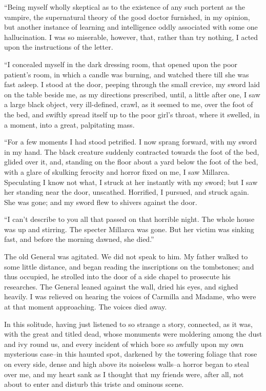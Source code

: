 \documentclass[11pt,twoside,makeidx,hidelinks,]{memoir}
\begin{document}
``Being myself wholly skeptical as to the existence of any such portent
as the vampire, the supernatural theory of the good doctor furnished, in
my opinion, but another instance of learning and intelligence oddly
associated with some one hallucination. I was so miserable, however,
that, rather than try nothing, I acted upon the instructions of
the letter.

``I concealed myself in the dark dressing room, that opened upon the poor
patient's room, in which a candle was burning, and watched there till
she was fast asleep. I stood at the door, peeping through the small
crevice, my sword laid on the table beside me, as my directions
prescribed, until, a little after one, I saw a large black object, very
ill-defined, crawl, as it seemed to me, over the foot of the bed, and
swiftly spread itself up to the poor girl's throat, where it swelled, in
a moment, into a great, palpitating mass.

``For a few moments I had stood petrified. I now sprang forward, with my
sword in my hand. The black creature suddenly contracted towards the
foot of the bed, glided over it, and, standing on the floor about a yard
below the foot of the bed, with a glare of skulking ferocity and horror
fixed on me, I saw Millarca. Speculating I know not what, I struck at
her instantly with my sword; but I saw her standing near the door,
unscathed. Horrified, I pursued, and struck again. She was gone; and my
sword flew to shivers against the door.

``I can't describe to you all that passed on that horrible night. The
whole house was up and stirring. The specter Millarca was gone. But her
victim was sinking fast, and before the morning dawned, she died.''

The old General was agitated. We did not speak to him. My father walked
to some little distance, and began reading the inscriptions on the
tombstones; and thus occupied, he strolled into the door of a side
chapel to prosecute his researches. The General leaned against the wall,
dried his eyes, and sighed heavily. I was relieved on hearing the voices
of Carmilla and Madame, who were at that moment approaching. The voices
died away.

In this solitude, having just listened to so strange a story, connected,
as it was, with the great and titled dead, whose monuments were
moldering among the dust and ivy round us, and every incident of which
bore so awfully upon my own mysterious case--in this haunted spot,
darkened by the towering foliage that rose on every side, dense and high
above its noiseless walls--a horror began to steal over me, and my heart
sank as I thought that my friends were, after all, not about to enter
and disturb this triste and ominous scene.
\end{document}

